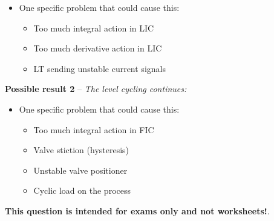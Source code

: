 \begin{itemize}
\item{} One specific problem that could cause this: 
\begin{itemize}

\item{} Too much integral action in LIC
\item{} Too much derivative action in LIC
\item{} LT sending unstable current signals
\end{itemize}
\end{itemize}

\noindent
{\bf Possible result 2} -- {\it The level cycling continues:}

\begin{itemize}
\item{} One specific problem that could cause this:
\begin{itemize}

\item{} Too much integral action in FIC
\item{} Valve stiction (hysteresis)
\item{} Unstable valve positioner
\item{} Cyclic load on the process
\end{itemize}
\end{itemize}







{\bf This question is intended for exams only and not worksheets!}.



